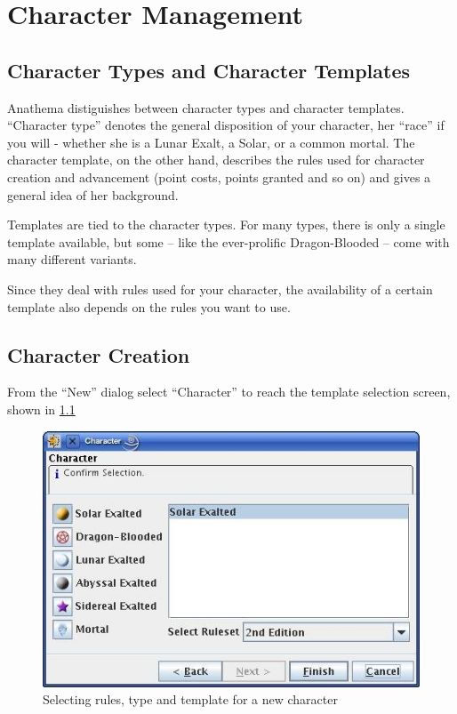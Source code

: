 \chapter{Character Management}

\section{Character Types and Character Templates}
Anathema distiguishes between character types and character templates. "`Character type"' denotes the general disposition of your character, her "`race"' if you will - whether she is a Lunar Exalt, a Solar, or a common mortal. The character template, on the other hand, describes the rules used for character creation and advancement (point costs, points granted and so on) and gives a general idea of her background.

Templates are tied to the character types. For many types, there is only a single template available, but some -- like the ever-prolific Dragon-Blooded -- come with many different variants.

Since they deal with rules used for your character, the availability of a certain template also depends on the rules you want to use.

\section{Character Creation}
From the "`New"' dialog select "`Character"' to reach the template selection screen, shown in \ref{fig:TemplateSelection}

\begin{figure}
	\centering
		\includegraphics[width=1.00\textwidth]{images/TemplateSelection.png}
	\caption{Selecting rules, type and template for a new character}
	\label{fig:TemplateSelection}
\end{figure}

